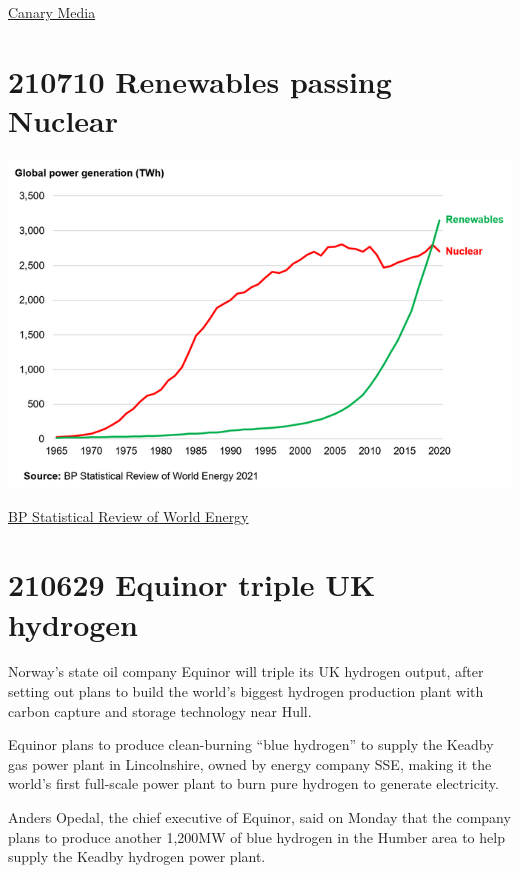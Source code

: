 \documentclass[
]{book}
\begin{document}
\href{https://www.canarymedia.com/articles/electric-vehicles/prototype-of-electric-moped-with-90-second-charge-time-set-to-hit-the-streets-in-2022}{Canary Media}

\hypertarget{renewables-passing-nuclear}{%
\section{210710 Renewables passing Nuclear}\label{renewables-passing-nuclear}}

\includegraphics{fig/renewables_passing_nuclear.png}

\href{https://www.bp.com/en/global/corporate/energy-economics/statistical-review-of-world-energy.html}{BP Statistical Review of World Energy}

\hypertarget{equinor-triple-uk-hydrogen}{%
\section{210629 Equinor triple UK hydrogen}\label{equinor-triple-uk-hydrogen}}

Norway's state oil company Equinor will triple its UK hydrogen output, after setting out plans to build the world's biggest hydrogen production plant with carbon capture and storage technology near Hull.

Equinor plans to produce clean-burning ``blue hydrogen'' to supply the Keadby gas power plant in Lincolnshire, owned by energy company SSE, making it the world's first full-scale power plant to burn pure hydrogen to generate electricity.

Anders Opedal, the chief executive of Equinor, said on Monday that the company plans to produce another 1,200MW of blue hydrogen in the Humber area to help supply the Keadby hydrogen power plant.
\end{document}
